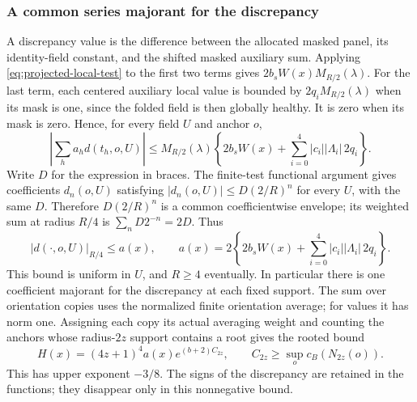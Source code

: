 \subsubsection{A common series majorant for the discrepancy}
A discrepancy value is the difference between the allocated
masked panel, its identity-field constant, and the shifted
masked auxiliary sum. Applying \eqref{eq:projected-local-test}
to the first two terms gives $2b_sW(x)M_{R/2}(\lambda)$.
For the last term, each centered auxiliary local value is bounded
by $2q_iM_{R/2}(\lambda)$ when its mask is one, since the folded
field is then globally healthy. It is zero when its mask is zero.
Hence, for every field $U$ and anchor $o$,
\[
 \left|\sum_h a_h d(t_h,o,U)\right|
 \le M_{R/2}(\lambda)
      \left\{2b_sW(x)+\sum_{i=0}^4|c_i||\Lambda_i|\,2q_i\right\}.
\]
Write $D$ for the expression in braces. The finite-test functional
argument gives coefficients $d_n(o,U)$ satisfying
$|d_n(o,U)|\le D(2/R)^n$ for every $U$, with the same $D$.
Therefore $D(2/R)^n$ is a common coefficientwise envelope; its
weighted sum at radius $R/4$ is $\sum_nD2^{-n}=2D$. Thus
\begin{equation}\label{eq:projected-discrepancy-value}
 |d(\cdot,o,U)|_{R/4}\le a(x),\qquad
 a(x)=2\left\{2b_sW(x)+\sum_{i=0}^4|c_i||\Lambda_i|\,2q_i\right\}.
\end{equation}
This bound is uniform in $U$, and $R\ge4$ eventually. In
particular there is one coefficient majorant for the discrepancy
at each fixed support. The sum over orientation copies uses the
normalized finite orientation average; for values it has norm
one. Assigning each copy its actual averaging weight and counting
the anchors whose radius-$2z$ support contains a root gives the
rooted bound
\begin{equation}\label{eq:projected-discrepancy-root}
                H(x)=(4z+1)^4 a(x)e^{(b+2)C_{2z}},
                  \qquad C_{2z}\ge\sup_o c_B(N_{2z}(o)).
\end{equation}
This has upper exponent $-3/8$. The signs of the discrepancy
are retained in the functions; they disappear only in this
nonnegative bound.

